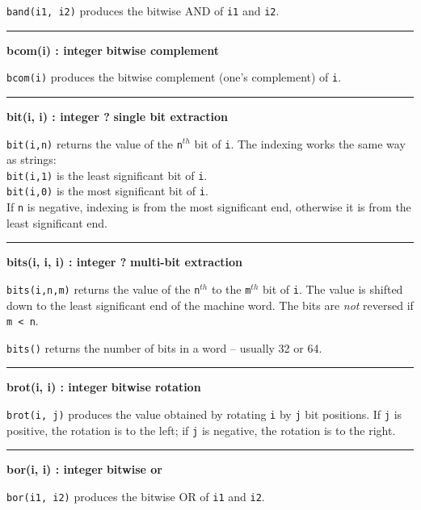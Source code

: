 \noindent
{}\texttt{band(i1, i2)} produces the bitwise AND of
\texttt{i1} and \texttt{i2}.

\bigskip\hrule\vspace{0.1cm}
\noindent
{\bf bcom(i) : integer } \hfill {\bf bitwise complement}

\noindent
\texttt{bcom(i)} produces the bitwise complement (one's
complement) of \texttt{i}.

\bigskip\hrule\vspace{0.1cm}
\noindent
{\bf bit(i, i) : integer ? } \hfill {\bf single bit extraction}

\noindent
\texttt{bit(i,n)} returns the value of the \texttt{n}$^{th}$
bit of \texttt{i}. The indexing works the same way as strings:\\
\texttt{bit(i,1)} is the least significant bit of \texttt{i}.\\
\texttt{bit(i,0)} is the most significant bit of \texttt{i}.\\
\noindent If \texttt{n} is negative, indexing is from the most significant end,
otherwise it is from the least significant end.

\bigskip\hrule\vspace{0.1cm}
\noindent
{\bf bits(i, i, i) : integer ? } \hfill {\bf multi-bit extraction}

\noindent
\texttt{bits(i,n,m)} returns the value of the \texttt{n}$^{th}$ to the
\texttt{m}$^{th}$ bit of \texttt{i}. The value is shifted down to the
least significant end of the machine word. The bits are {\em not\/} reversed if
\verb|m < n|.

\noindent \texttt{bits()} returns the number of bits in a word -- usually 32 or 64.

\bigskip\hrule\vspace{0.1cm}
\noindent
{\bf brot(i, i) : integer } \hfill {\bf bitwise rotation}

\noindent
{}\texttt{brot(i, j)} produces the value obtained by
rotating \texttt{i} by \texttt{j} bit positions.
If \texttt{j} is positive, the rotation is to the left;
if \texttt{j} is negative, the rotation is to the right.

\bigskip\hrule\vspace{0.1cm}
\noindent
{\bf bor(i, i) : integer } \hfill {\bf bitwise or}

\noindent
{}\texttt{bor(i1, i2)} produces the bitwise OR of
\texttt{i1} and \texttt{i2}.

